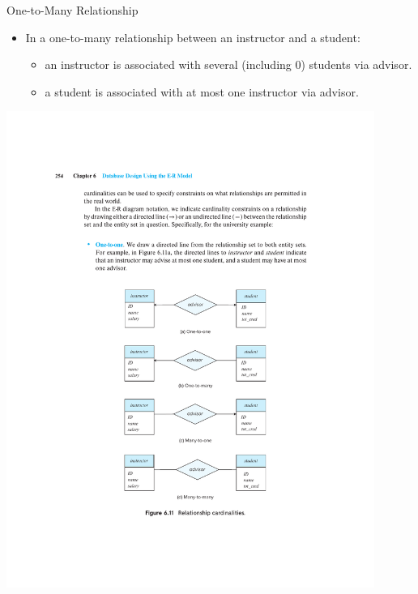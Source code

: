 \documentclass{beamer}
\begin{document}
\begin{frame}{One-to-Many Relationship}
    \begin{itemize}
        \item In a one-to-many relationship between an instructor and a student:
        \begin{itemize}
            \item an instructor is associated with several (including 0) students via advisor.
            \item a student is associated with at most one instructor via advisor.
        \end{itemize}
    \end{itemize}
    \centering
    \includegraphics[trim={6cm 12cm 6cm 13.25cm}, clip, width=0.9\textwidth]{figures/p254}
\end{frame}
\end{document}
